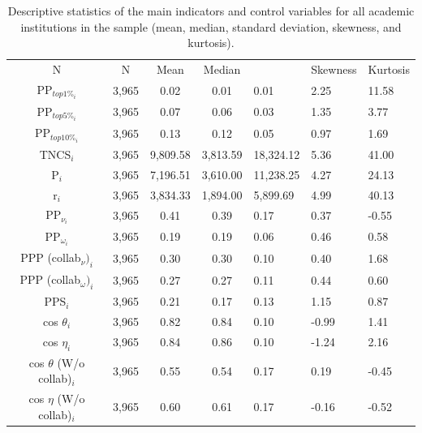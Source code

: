 \documentclass[draft,final]{vutinfth} %
\begin{document}

\begin{table}[!ht]
\caption{Descriptive statistics of the main indicators and control variables for all academic institutions in the sample (mean, median, standard deviation, skewness, and kurtosis).}
\label{Table S1}
\centering
\begin{tabular}{@{}
>{\columncolor[HTML]{FFFFFF}}c 
>{\columncolor[HTML]{FFFFFF}}c 
>{\columncolor[HTML]{FFFFFF}}c 
>{\columncolor[HTML]{FFFFFF}}c 
>{\columncolor[HTML]{FFFFFF}}l 
>{\columncolor[HTML]{FFFFFF}}l 
>{\columncolor[HTML]{FFFFFF}}l @{}}
\toprule
\multicolumn{7}{c}{\cellcolor[HTML]{FFFFFF}\textbf{Descriptive Statistics}}         \\ \midrule
N                          & N   & Mean & Median & \multicolumn{1}{c}{\cellcolor[HTML]{FFFFFF}Std. Deviation} & Skewness & Kurtosis \\ \midrule
PP$_{top1\%_i}$   & 3,965 & 0.02   & 0.01   & 0.01   & 2.25 & 11.58 \\ \midrule
PP$_{top5\%_i}$ & 3,965 & 0.07   & 0.06   & 0.03   & 1.35 & 3.77 \\ \midrule
PP$_{top10\%_i}$ & 3,965 & 0.13   & 0.12   & 0.05   & 0.97 & 1.69 \\ \midrule
TNCS$_{i}$  & 3,965 & 9,809.58 & 3,813.59 & 18,324.12 & 5.36 & 41.00 \\ \midrule
P$_{i}$      & 3,965 & 7,196.51 & 3,610.00 & 11,238.25 & 4.27 & 24.13 \\ \midrule
r$_{i}$    & 3,965 & 3,834.33 & 1,894.00 & 5,899.69 & 4.99 & 40.13 \\ \midrule
PP$_{\nu_i}$    & 3,965 & 0.41   & 0.39   & 0.17   & 0.37 & -0.55 \\ \midrule
PP$_{\omega_i}$      & 3,965 & 0.19   & 0.19   & 0.06   & 0.46 & 0.58 \\ \midrule
PPP (collab$_{\nu})_{i}$ & 3,965 & 0.30   & 0.30   & 0.10   & 0.40 & 1.68 \\ \midrule
PPP (collab$_{\omega})_{i}$ & 3,965 & 0.27  & 0.27   & 0.11   & 0.44 & 0.60 \\ \midrule
PPS$_{i}$  & 3,965 & 0.21  & 0.17 & 0.13 & 1.15 & 0.87 \\ \midrule
cos $\theta_i$        & 3,965 & 0.82 & 0.84  & 0.10                            & -0.99  & 1.41   \\ \midrule
cos $\eta_i$       & 3,965 & 0.84 & 0.86  & 0.10                            & -1.24  & 2.16   \\ \midrule
cos $\theta$ (W/o collab)$_{i}$ & 3,965 & 0.55 & 0.54  & 0.17                            & 0.19   & -0.45  \\ \midrule
cos $\eta$ (W/o collab)$_{i}$  & 3,965 & 0.60 & 0.61  & 0.17                            & -0.16  & -0.52  \\ \bottomrule
\end{tabular}
\end{table}
\end{document}
